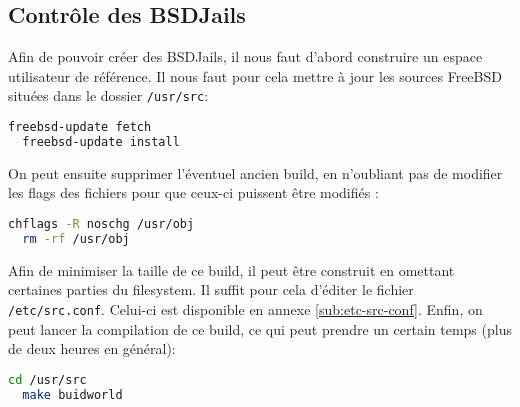 \documentclass[10pt,a4paper]{article}
\begin{document}
\subsection{Contrôle des BSDJails}
\label{subs:Contrôle des BSDJails}
Afin de pouvoir créer des BSDJails, il nous faut d'abord construire un espace utilisateur de référence.
Il nous faut pour cela mettre à jour les sources FreeBSD situées dans le dossier \texttt{/usr/src}:
\begin{lstlisting}[language=bash]
  freebsd-update fetch
  freebsd-update install
\end{lstlisting}
On peut ensuite supprimer l'éventuel ancien build, en n'oubliant pas de modifier les flags des fichiers pour que ceux-ci puissent être modifiés :
\begin{lstlisting}[language=bash]
  chflags -R noschg /usr/obj
  rm -rf /usr/obj
\end{lstlisting}
Afin de minimiser la taille de ce build, il peut être construit en omettant certaines parties du filesystem. Il suffit pour cela d'éditer le fichier \texttt{/etc/src.conf}. Celui-ci est disponible en annexe \ref{sub:etc-src-conf}.
Enfin, on peut lancer la compilation de ce build, ce qui peut prendre un certain temps (plus de deux heures en général):
\begin{lstlisting}[language=bash]
  cd /usr/src
  make buidworld
\end{lstlisting}
\end{document}
